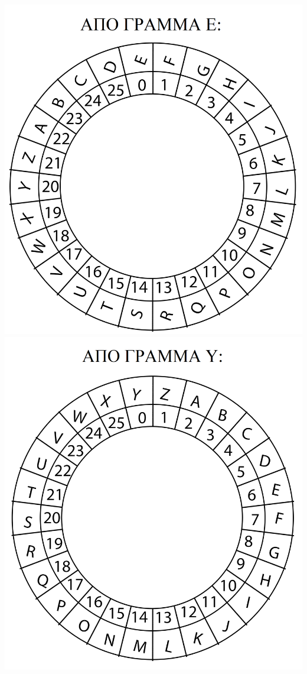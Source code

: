 \documentclass[a4paper, 11pt]{article}
\begin{document}
\includegraphics[scale=0.08]{diskwithe.png}   
\includegraphics[scale=0.08]{diskwithy.png} 
 
\end{document}
